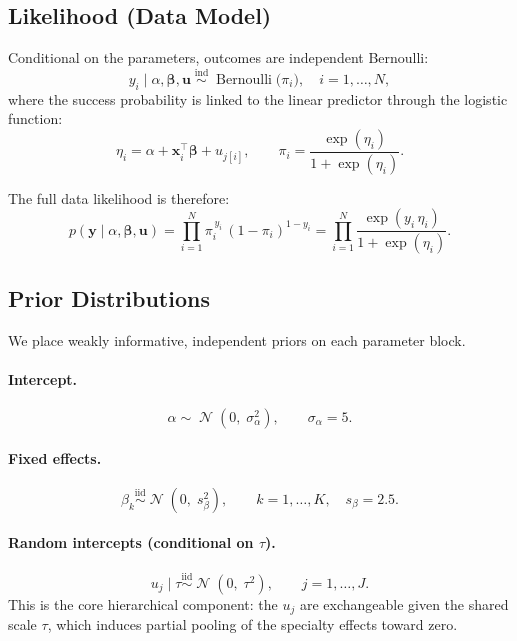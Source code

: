\documentclass[11pt]{article}
\newcommand{\bx}{\bm{x}}
\newcommand{\by}{\bm{y}}
\newcommand{\bbeta}{\bm{\beta}}
\newcommand{\bu}{\bm{u}}
\newcommand{\iid}{\overset{\text{iid}}{\sim}}
\newcommand{\ind}{\overset{\text{ind}}{\sim}}
\DeclareMathOperator{\Bernoulli}{Bernoulli}
\DeclareMathOperator{\Normal}{\mathcal{N}}
\begin{document}
\subsection{Likelihood (Data Model)}

Conditional on the parameters, outcomes are independent Bernoulli:
\begin{equation}\label{eq:likelihood-i}
  y_i \mid \alpha, \bbeta, \bu \;\ind\;
  \Bernoulli\!\bigl(\pi_i\bigr),
  \quad i = 1,\dots,N,
\end{equation}
where the success probability is linked to the linear predictor through
the logistic function:
\begin{equation}\label{eq:eta}
  \eta_i = \alpha + \bx_i^\top \bbeta + u_{j[i]},
  \qquad
  \pi_i = \frac{\exp(\eta_i)}{1 + \exp(\eta_i)}.
\end{equation}

The full data likelihood is therefore:
\begin{equation}\label{eq:likelihood}
  p(\by \mid \alpha, \bbeta, \bu)
  = \prod_{i=1}^{N} \pi_i^{\,y_i}\,(1-\pi_i)^{1-y_i}
  = \prod_{i=1}^{N}
    \frac{\exp(y_i\,\eta_i)}{1+\exp(\eta_i)}.
\end{equation}

\subsection{Prior Distributions}

We place weakly informative, independent priors on each parameter block.

\paragraph{Intercept.}
\begin{equation}\label{eq:prior-alpha}
  \alpha \sim \Normal(0,\;\sigma_\alpha^2),
  \qquad \sigma_\alpha = 5.
\end{equation}

\paragraph{Fixed effects.}
\begin{equation}\label{eq:prior-beta}
  \beta_k \iid \Normal(0,\;s_\beta^2),
  \qquad k = 1,\dots,K, \quad s_\beta = 2.5.
\end{equation}

\paragraph{Random intercepts (conditional on $\tau$).}
\begin{equation}\label{eq:prior-u}
  u_j \mid \tau \iid \Normal(0,\;\tau^2),
  \qquad j = 1,\dots,J.
\end{equation}
This is the core hierarchical component: the $u_j$ are exchangeable given
the shared scale $\tau$, which induces partial pooling of the specialty
effects toward zero.
\end{document}
